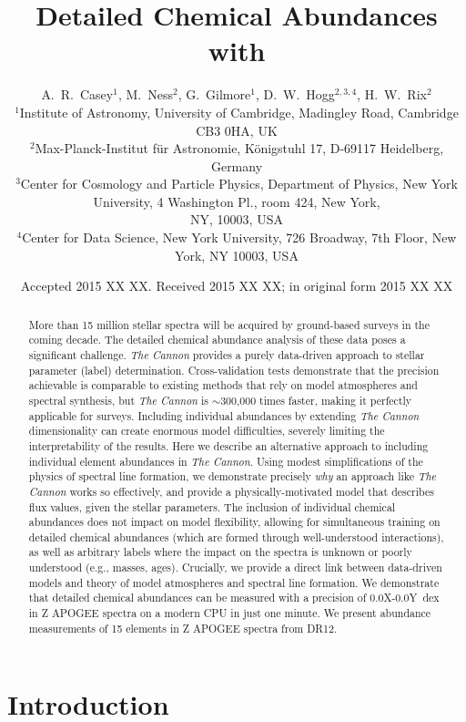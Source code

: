 \documentclass[useAMS,usenatbib]{mn2e}
\title[Detailed Chemical Abundances with \tc{}]{Detailed Chemical Abundances with \tc{}}
\author[Casey et al.]{A.~R.~Casey$^1$, M.~Ness$^2$, G.~Gilmore$^1$,
    D.~W.~Hogg$^{2,3,4}$, H.~W.~Rix$^2$ \\ 
$^1$Institute of Astronomy, University of Cambridge, Madingley Road, Cambridge
    CB3 0HA, UK\\
$^2$Max-Planck-Institut f\"ur Astronomie, K\"onigstuhl 17, D-69117 Heidelberg,
    Germany\\
$^3$Center for Cosmology and Particle Physics, Department of Physics, New York
    University, 4 Washington Pl., room 424, New York, \\
    NY, 10003, USA\\
$^4$Center for Data Science, New York University, 726 Broadway, 7th Floor,
    New York, NY 10003, USA}
\newcommand\tc{\textit{The Cannon}}
\begin{document}
\date{Accepted 2015 XX XX. Received 2015 XX XX; in original form 2015 XX XX}

\pagerange{\pageref{firstpage}--\pageref{lastpage}} 

\maketitle

\label{firstpage}

\begin{abstract}
More than 15 million stellar spectra will be acquired by ground-based surveys in
the coming decade. The detailed chemical abundance analysis of these data poses
a significant challenge. \tc{} provides a purely data-driven
approach to stellar parameter (label) determination. Cross-validation tests
demonstrate that the precision achievable is comparable to existing methods that
rely on model atmospheres and spectral synthesis, but \tc{} is $\sim$300,000 times
faster, making it perfectly applicable for surveys. Including individual abundances by extending \tc{} dimensionality can create enormous model difficulties, severely limiting the interpretability of the results. Here
we describe an alternative approach to including individual element abundances
in \tc{}. Using modest simplifications of the physics of spectral line formation,
we demonstrate precisely \textit{why} an approach like \tc{} works so effectively,
and provide a physically-motivated model that describes flux values, given the
stellar parameters. The inclusion of individual chemical abundances does not
impact on model flexibility, allowing for simultaneous training on detailed
chemical abundances (which are formed through well-understood interactions), as well as arbitrary labels where the impact on the spectra
is unknown or poorly understood (e.g., masses, ages). Crucially, we provide a direct link
between data-driven models and theory of model atmospheres and spectral line formation. We demonstrate that
detailed chemical abundances can be measured with a precision of 0.0X-0.0Y~dex
in Z APOGEE spectra on a modern CPU in just one minute. We present abundance
measurements of 15 elements in Z APOGEE spectra from DR12.
\end{abstract}

\begin{keywords}
\end{keywords}

\section{Introduction}
\label{sec:introduction}
\end{document}
